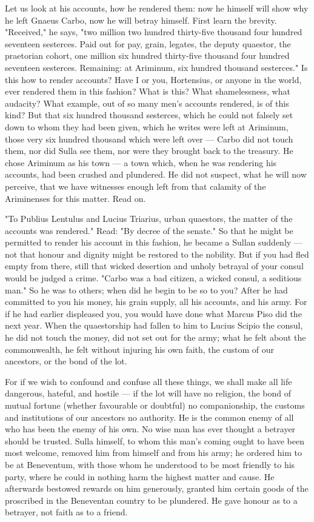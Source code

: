  Let us look at his accounts, how he rendered them: now he himself will show why he left Gnaeus Carbo, now he will betray himself. First learn the brevity. "Received," he says, "two million two hundred thirty-five thousand four hundred seventeen sesterces. Paid out for pay, grain, legates, the deputy quaestor, the praetorian cohort, one million six hundred thirty-five thousand four hundred seventeen sesterces. Remaining: at Ariminum, six hundred thousand sesterces." Is this how to render accounts? Have I or you, Hortensius, or anyone in the world, ever rendered them in this fashion? What is this? What shamelessness, what audacity? What example, out of so many men's accounts rendered, is of this kind? But that six hundred thousand sesterces, which he could not falsely set down to whom they had been given, which he writes were left at Ariminum, those very six hundred thousand which were left over --- Carbo did not touch them, nor did Sulla see them, nor were they brought back to the treasury. He chose Ariminum as his town --- a town which, when he was rendering his accounts, had been crushed and plundered. He did not suspect, what he will now perceive, that we have witnesses enough left from that calamity of the Ariminenses for this matter. Read on.

 "To Publius Lentulus and Lucius Triarius, urban quaestors, the matter of the accounts was rendered." Read: "By decree of the senate." So that he might be permitted to render his account in this fashion, he became a Sullan suddenly --- not that honour and dignity might be restored to the nobility. But if you had fled empty from there, still that wicked desertion and unholy betrayal of your consul would be judged a crime. "Carbo was a bad citizen, a wicked consul, a seditious man." So he was to others; when did he begin to be so to you? After he had committed to you his money, his grain supply, all his accounts, and his army. For if he had earlier displeased you, you would have done what Marcus Piso did the next year. When the quaestorship had fallen to him to Lucius Scipio the consul, he did not touch the money, did not set out for the army; what he felt about the commonwealth, he felt without injuring his own faith, the custom of our ancestors, or the bond of the lot.

 For if we wish to confound and confuse all these things, we shall make all life dangerous, hateful, and hostile --- if the lot will have no religion, the bond of mutual fortune (whether favourable or doubtful) no companionship, the customs and institutions of our ancestors no authority. He is the common enemy of all who has been the enemy of his own. No wise man has ever thought a betrayer should be trusted. Sulla himself, to whom this man's coming ought to have been most welcome, removed him from himself and from his army; he ordered him to be at Beneventum, with those whom he understood to be most friendly to his party, where he could in nothing harm the highest matter and cause. He afterwards bestowed rewards on him generously, granted him certain goods of the proscribed in the Beneventan country to be plundered. He gave honour as to a betrayer, not faith as to a friend.


